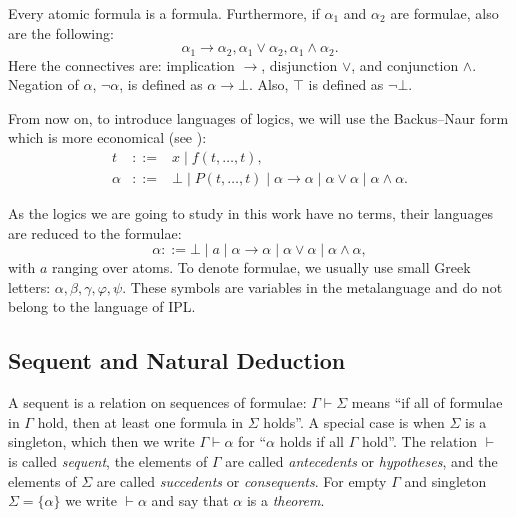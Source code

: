 \begin{definition}[Formula]
Every atomic formula is a formula. Furthermore, if $\alpha_1$ and $\alpha_2$ are formulae, also are the following:
\[
\alpha_1 \rightarrow \alpha_2, \alpha_1 \vee \alpha_2, \alpha_1 \wedge \alpha_2.
\]
Here the connectives are: implication $\rightarrow$, disjunction $\vee$, and conjunction $\wedge$.
Negation of $\alpha$, $\neg\alpha$, is defined as $\alpha \rightarrow \bot$. Also, $\top$ is defined as $\neg\bot$.
\end{definition}

From now on, to introduce languages of logics, we will use the Backus--Naur form which is more economical (see \cite{DBLP:conf/ifip/Backus59}):
\begin{eqnarray*}
t &::=& x \mid f(t, \dots, t), \\
\alpha &::=& \bot \mid P(t, \dots, t) \mid \alpha \rightarrow \alpha \mid \alpha \vee \alpha \mid \alpha \wedge \alpha.
\end{eqnarray*}

As the logics we are going to study in this work have no terms, their languages are reduced to the formulae:
\[
\alpha ::= \bot \mid a \mid \alpha \rightarrow \alpha \mid \alpha \vee \alpha \mid \alpha \wedge \alpha,
\]
with $a$ ranging over atoms. To denote formulae, we usually use small Greek letters: $\alpha, \beta, \gamma, \varphi, \psi$. These symbols are variables in the metalanguage and do not belong to the language of IPL.

\subsection{Sequent and Natural Deduction}

\begin{definition}[Sequent]
A sequent is a relation on sequences of formulae: $\Gamma \vdash \Sigma$ means ``if all of formulae in $\Gamma$ hold, then at least one formula in $\Sigma$ holds''. A special case is when $\Sigma$ is a singleton, which then we write $\Gamma \vdash \alpha$ for ``$\alpha$ holds if all $\Gamma$ hold''.
The relation $\vdash$ is called \textit{sequent}, the elements of $\Gamma$ are called \textit{antecedents} or \textit{hypotheses}, and the elements of $\Sigma$ are called \textit{succedents} or \textit{consequents}. For empty $\Gamma$ and singleton $\Sigma = \{\alpha\}$ we write $\vdash \alpha$ and say that $\alpha$ is a \textit{theorem}.
\end{definition}

